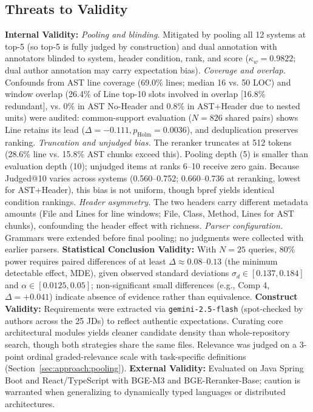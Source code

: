 \subsection{Threats to Validity}
\textbf{Internal Validity:} \textit{Pooling and blinding.} Mitigated by pooling all 12 systems at top-5 (so top-5 is fully judged by construction) and dual annotation with annotators blinded to system, header condition, rank, and score ($\kappa_w = 0.9822$; dual author annotation may carry expectation bias). \textit{Coverage and overlap.} Confounds from AST line coverage (69.0\% lines; median 16 vs. 50 LOC) and window overlap (26.4\% of Line top-10 slots involved in overlap [16.8\% redundant], vs. 0\% in AST No-Header and 0.8\% in AST+Header due to nested units) were audited: common-support evaluation ($N=826$ shared pairs) shows Line retains its lead ($\Delta = -0.111, p_{\mathrm{Holm}} = 0.0036$), and deduplication preserves ranking. \textit{Truncation and unjudged bias.} The reranker truncates at 512 tokens (28.6\% line vs. 15.8\% AST chunks exceed this). Pooling depth (5) is smaller than evaluation depth (10); unjudged items at ranks 6--10 receive zero gain. Because Judged@10 varies across systems (0.560--0.752; 0.660--0.736 at reranking, lowest for AST+Header), this bias is not uniform, though bpref yields identical condition rankings. \textit{Header asymmetry.} The two headers carry different metadata amounts (File and Lines for line windows; File, Class, Method, Lines for AST chunks), confounding the header effect with richness. \textit{Parser configuration.} Grammars were extended before final pooling; no judgments were collected with earlier parsers.
\textbf{Statistical Conclusion Validity:} With $N = 25$ queries, 80\% power requires paired differences of at least $\Delta \approx 0.08$--$0.13$ (the minimum detectable effect, MDE), given observed standard deviations $\sigma_d \in [0.137, 0.184]$ and $\alpha \in [0.0125, 0.05]$; non-significant small differences (e.g., Comp 4, $\Delta = +0.041$) indicate absence of evidence rather than equivalence.
\textbf{Construct Validity:} Requirements were extracted via \texttt{gemini-2.5-flash} (spot-checked by authors across the 25 JDs) to reflect authentic expectations. Curating core architectural modules yields cleaner candidate density than whole-repository search, though both strategies share the same files. Relevance was judged on a 3-point ordinal graded-relevance scale with task-specific definitions (Section~\ref{sec:approach:pooling}). 
\textbf{External Validity:} Evaluated on Java Spring Boot and React/TypeScript with BGE-M3 and BGE-Reranker-Base; caution is warranted when generalizing to dynamically typed languages or distributed architectures.
